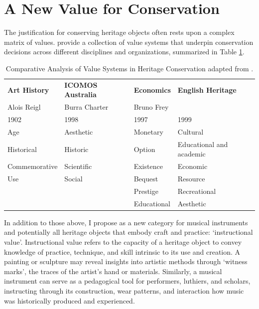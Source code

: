 \section{A New Value for Conservation}

The justification for conserving heritage objects often rests upon a complex matrix of values. \textcite{avrami_values_2000} provide a collection of value systems that underpin conservation decisions across different disciplines and organizations, summarized in Table \ref{tab:values_comparison}.

\begin{table}[h]
    \footnotesize
    \centering
        \begin{tabular}{llll}
            \toprule
            \textbf{Art History} & \textbf{ICOMOS Australia} & \textbf{Economics} & \textbf{English Heritage} \\
            Alois Reigl & Burra Charter & Bruno Frey &  \\ 
            1902 & 1998 & 1997 & 1999 \\ \hline
            Age & Aesthetic & Monetary & Cultural \\ 
            Historical & Historic & Option & Educational and academic \\ 
            Commemorative & Scientific & Existence & Economic \\ 
            Use & Social & Bequest & Resource \\ 
            & & Prestige & Recreational \\
            & & Educational & Aesthetic \\
            \bottomrule
        \end{tabular}    
    \caption{Comparative Analysis of Value Systems in Heritage Conservation adapted from \cite{avrami_values_2000}.}
    \label{tab:values_comparison}
\end{table}

In addition to those above, I propose as a new category for musical instruments and potentially all heritage objects that embody craft and practice: `instructional value'. Instructional value refers to the capacity of a heritage object to convey knowledge of practice, technique, and skill intrinsic to its use and creation. A painting or sculpture may reveal insights into artistic methods through `witness marks', the traces of the artist’s hand or materials. Similarly, a musical instrument can serve as a pedagogical tool for performers, luthiers, and scholars, instructing through its construction, wear patterns, and interaction how music was historically produced and experienced.

